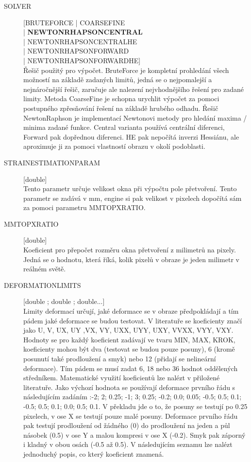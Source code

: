 \documentclass[a4paper,12pt]{article}
\begin{document}
\begin{description}
\item[SOLVER] [BRUTE\textunderscore FORCE | COARSE\textunderscore FINE\\| \textbf{NEWTON\textunderscore RHAPSON\textunderscore CENTRAL}\\| NEWTON\textunderscore RHAPSON\textunderscore CENTRAL\textunderscore HE\\| NEWTON\textunderscore RHAPSON\textunderscore FORWARD\\| NEWTON\textunderscore RHAPSON\textunderscore FORWARD\textunderscore HE] \\
Řešič použitý pro výpočet. BruteForce je kompletní prohledání všech možností na základě zadaných limitů, jedná se o nejpomalejší a nejnáročnější řešič, zaručuje ale nalezení nejvhodnějšího řešení pro zadané limity. Metoda CoarseFine je schopna urychlit výpočet za pomoci postupného zpřesňování řešení na základě hrubého odhadu. Řešič NewtonRaphson je implementací Newtonovi metody pro hledání maxima / minima zadané funkce. Central varianta používá centrální diferenci, Forward pak dopřednou diferenci. HE pak nepočítá inverzi Hessiánu, ale aproximuje ji za pomoci vlastností obrazu v okolí podoblasti.
\item[STRAIN\textunderscore ESTIMATION\textunderscore PARAM] [double]\\
Tento parametr určuje velikost okna při výpočtu pole přetvoření. Tento parametr se zadává v mm, engine si pak velikost v pixelech dopočítá sám za pomoci parametru MM\textunderscore TO\textunderscore PX\textunderscore RATIO.
\item[MM\textunderscore TO\textunderscore PX\textunderscore RATIO] [double]\\
Koeficient pro přepočet rozměru okna přetvoření z milimetrů na pixely. Jedná se o hodnotu, která říká, kolik pixelů v obraze je jeden milimetr v reálném světě.
\item[DEFORMATION\textunderscore LIMITS] [double ; double ; double...]\\
Limity deformací určují, jaké deformace se v obraze předpokládají a tím pádem jaké deformace se budou testovat. V literatuře se koeficienty značí jako U, V, UX, UY ,VX, VY, UXX, UYY, UXY, VVXX, VYY, VXY.  Hodnoty se pro každý koeficient zadávají ve tvaru MIN, MAX, KROK, koeficienty mohou být dva (testovat se budou pouze posuny), 6 (kromě posunutí také prodloužení a smyk) nebo 12 (přidají se nelineární deformace). Tím pádem se musí zadat 6, 18 nebo 36 hodnot oddělených středníkem. Matematické využití koeficientů lze nalézt v přiložené literatuře. Jako výchozí hodnota se používají deformace prvního řádu s následujícím zadáním :-2; 2; 0.25; -1; 3; 0.25; -0.2; 0.0; 0.05; -0.5; 0.5; 0.1; -0.5; 0.5; 0.1; 0.0; 0.5; 0.1. V překladu jde o to, že posuny se testují po 0.25 pixelech, v ose X se testují pouze malé posuny. Deformace prvního řádu pak testují prodloužení od žádného (0) do prodloužení na jeden a půl násobek (0.5) v ose Y a malou kompresi v ose X (-0.2). Smyk pak záporný i kladný v obou osách (-0.5 až 0.5). V následujícím seznamu lze nalézt jednoduchý popis, co který koeficient znamená.

\end{description}
\end{document}
